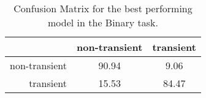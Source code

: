 \begin{table}
\centering
\begin{tabular}{|r|c|c|}
\hline
\multicolumn{1}{|l|}{} & non-transient    & transient   \\ \hline \hline
non-transient                & 90.94       & 9.06    \\ \hline
transient                    & 15.53       & 84.47    \\ \hline
\end{tabular}
\caption{Confusion Matrix for the best performing model in the Binary task.}
\label{Confusion-Binary}
\end{table}
